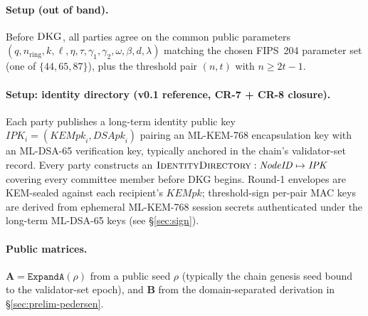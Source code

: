 \documentclass[11pt,a4paper]{article}
\theoremstyle{definition}
\theoremstyle{remark}
\newcommand{\DKG}{\textsc{DKG}}
\begin{document}
\paragraph{Setup (out of band).}
Before $\DKG$, all parties agree on the common public parameters
$(q, n_{\mathrm{ring}}, k, \ell, \eta, \tau, \gamma_1, \gamma_2, \omega, \beta, d, \lambda)$
matching the chosen FIPS~204 parameter set (one of $\{44, 65, 87\}$),
plus the threshold pair $(n, t)$ with $n \ge 2t-1$.

\paragraph{Setup: identity directory (v0.1 reference, CR-7 + CR-8
closure).}
Each party publishes a long-term identity public key
$\mathit{IPK}_i = (\mathit{KEMpk}_i, \mathit{DSApk}_i)$ pairing an
ML-KEM-768 encapsulation key with an ML-DSA-65 verification key,
typically anchored in the chain's validator-set record. Every party
constructs an $\textsc{IdentityDirectory}: \mathit{NodeID} \mapsto
\mathit{IPK}$ covering every committee member before DKG begins.
Round-1 envelopes are KEM-sealed against each recipient's
$\mathit{KEMpk}$; threshold-sign per-pair MAC keys are derived from
ephemeral ML-KEM-768 session secrets authenticated under the long-term
ML-DSA-65 keys (see \S\ref{sec:sign}).

\paragraph{Public matrices.}
$\mathbf{A} = \texttt{ExpandA}(\rho)$ from a public seed $\rho$
(typically the chain genesis seed bound to the validator-set epoch),
and $\mathbf{B}$ from the domain-separated derivation in
\S\ref{sec:prelim-pedersen}.
\end{document}
